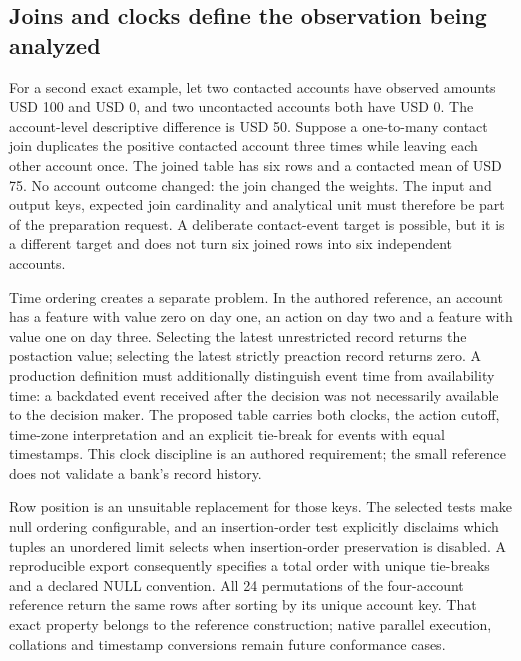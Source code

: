 \subsection{Joins and clocks define the observation being analyzed}
\label{exec19:duckdb-keys}

For a second exact example, let two contacted accounts have observed amounts
USD 100 and USD 0, and two uncontacted accounts both have USD 0. The
account-level descriptive difference is USD 50. Suppose a one-to-many contact
join duplicates the positive contacted account three times while leaving each
other account once. The joined table has six rows and a contacted mean of
USD 75. No account outcome changed: the join changed the weights. The input
and output keys, expected join cardinality and analytical unit must therefore
be part of the preparation request. A deliberate contact-event target is
possible, but it is a different target and does not turn six joined rows into
six independent accounts.\citep{exec19_duckdb_reference}

Time ordering creates a separate problem. In the authored reference, an
account has a feature with value zero on day one, an action on day two and a
feature with value one on day three. Selecting the latest unrestricted record
returns the postaction value; selecting the latest strictly preaction record
returns zero. A production definition must additionally distinguish event time
from availability time: a backdated event received after the decision was not
necessarily available to the decision maker. The proposed table carries both
clocks, the action cutoff, time-zone interpretation and an explicit tie-break
for events with equal timestamps. This clock discipline is an authored
requirement; the small reference does not validate a bank's record history.

Row position is an unsuitable replacement for those keys. The selected tests
make null ordering configurable, and an insertion-order test explicitly
disclaims which tuples an unordered limit selects when insertion-order
preservation is disabled. A reproducible export consequently specifies a total
order with unique tie-breaks and a declared NULL convention. All 24 permutations
of the four-account reference return the same rows after sorting by its unique
account key. That exact property belongs to the reference construction; native
parallel execution, collations and timestamp conversions remain future
conformance cases.\citep{exec19_duckdb_source,exec19_duckdb_reference}

